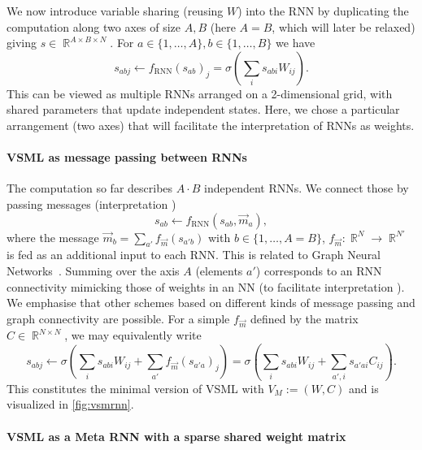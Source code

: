 \documentclass{article}
\newcommand{\principle}{VSML}
\DeclareMathOperator{\R}{\mathbb{R}}
\newcommand*\circled[1]{\tikz[baseline=(char.base)]{
            \node[shape=circle,draw,inner sep=0.5pt] (char) {#1};}}
\newcommand{\fmsg}{f_{\overrightarrow m}}
\newcommand{\sfmsg}{\overrightarrow m}
\newcommand{\intMP}{\circled{B}}
\newcommand{\intNN}{\circled{C}}
\begin{document}
We now introduce variable sharing (reusing $W$) into the RNN by duplicating the computation along two axes of size $A, B$ (here $A = B$, which will later be relaxed) giving $s \in \R^{A \times B \times N}$.
For $a \in \{1, \ldots, A\}, b \in \{1, \ldots, B\}$ we have
\begin{equation}
    s_{abj} \leftarrow f_{\textrm{RNN}}(s_{ab})_j = \sigma(\sum_i s_{abi} W_{ij}).
\end{equation}
This can be viewed as multiple RNNs arranged on a 2-dimensional grid, with shared parameters that update independent states.
Here, we chose a particular arrangement (two axes) that will facilitate the interpretation {\intNN} of RNNs as weights.

\paragraph{VSML as message passing between RNNs}
The computation so far describes $A \cdot B$ independent RNNs.
We connect those by passing messages (interpretation {\intMP})
\begin{equation}\label{eq:message_passing}
    s_{ab} \leftarrow f_{\textrm{RNN}}(s_{ab}, \sfmsg_a),
\end{equation}
where the message $\sfmsg_b = \sum_{a'} \fmsg(s_{a'b})$ with $b \in \{1,\ldots,A=B\}$, $\fmsg: \R^{N} \to \R^{N'}$ is fed as an additional input to each RNN.
This is related to Graph Neural Networks~\citep{sperduti1994encoding,wu2020comprehensive}.
Summing over the axis $A$ (elements $a'$) corresponds to an RNN connectivity mimicking those of weights in an NN (to facilitate interpretation {\intNN}).
We emphasise that other schemes based on different kinds of message passing and graph connectivity are possible.
For a simple $\fmsg$ defined by the matrix $C \in \R^{N \times N}$, we may equivalently write
\begin{equation}\label{eq:interact}
    s_{abj} \leftarrow \sigma ( \sum_i s_{abi} W_{ij} + \sum_{a'} \fmsg(s_{a'a})_j)
    = \sigma ( \sum_i s_{abi} W_{ij} + \sum_{a',i} s_{a'ai} C_{ij}).
\end{equation}
This constitutes the minimal version of {\principle} with $V_M := (W, C)$ and is visualized in \autoref{fig:vsmrnn}.


\paragraph{VSML as a Meta RNN with a sparse shared weight matrix}
\end{document}
